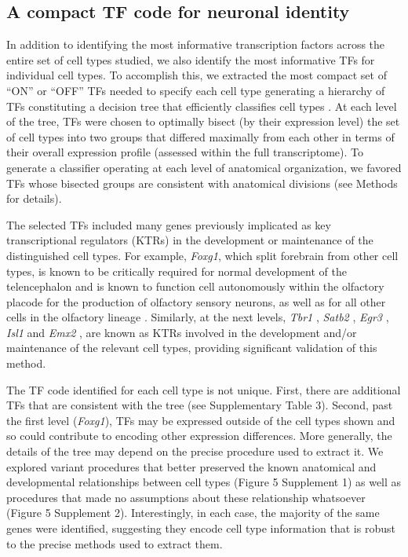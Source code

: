 \subsection{A compact TF code for neuronal identity}
In addition to identifying the most informative transcription factors across the entire set of cell types studied, we also identify the most informative TFs for individual cell types. To accomplish this, we extracted the most compact set of “ON” or “OFF” TFs needed to specify each cell type generating a hierarchy of TFs constituting a decision tree  \citep{Saeys_2007} that efficiently classifies cell types \citep{Gabitto_2016}. At each level of the tree, TFs were chosen to optimally bisect (by their expression level) the set of cell types into two groups that differed maximally from each other in terms of their overall expression profile (assessed within the full transcriptome). To generate a classifier operating at each level of anatomical organization, we favored TFs whose bisected groups are consistent with anatomical divisions (see Methods for details).

The selected TFs included many genes previously implicated as key transcriptional regulators (KTRs) in the development or maintenance of the distinguished cell types. For example, \textit{Foxg1}, which split forebrain from other cell types, is known to be critically required for normal development of the telencephalon \citep{Xuan_1995, Danesin_2012} and is known to function cell autonomously within the olfactory placode for the production of olfactory sensory neurons, as well as for all other cells in the olfactory lineage \citep{Duggan_2008}. 
Similarly, at the next levels, \textit{Tbr1} \citep{Bedogni_2010}, \textit{Satb2} \citep{Sweeney_2017}, \textit{Egr3} \citep{Chandra_2015}, \textit{Isl1} \citep{Lu_2013} and \textit{Emx2} \citep{Zhang_2016}, are known as KTRs involved in the development and/or maintenance of the relevant cell types, providing significant validation of this method.

The TF code identified for each cell type is not unique. First, there are additional TFs that are consistent with the tree (see Supplementary Table 3). Second, past the first level (\textit{Foxg1}), TFs may be expressed outside of the cell types shown and so could contribute to encoding other expression differences. More generally, the details of the tree may depend on the precise procedure used to extract it. We explored variant procedures that better preserved the known anatomical and developmental relationships between cell types (Figure 5 Supplement 1) as well as procedures that made no assumptions about these relationship whatsoever (Figure 5 Supplement 2). Interestingly, in each case, the majority of the same genes were identified, suggesting they encode cell type information that is robust to the precise methods used to extract them.

